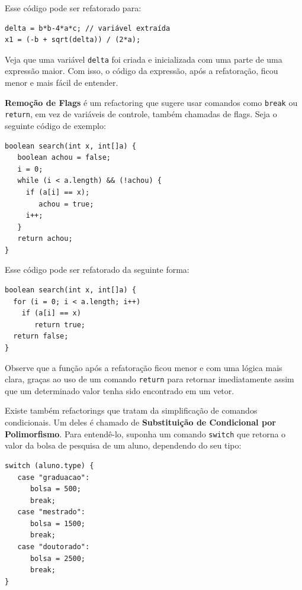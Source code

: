 \documentclass[
  11pt,
  twoside]{book}
\newcommand{\passthrough}[1]{#1}
\begin{document}
Esse código pode ser refatorado para:

\begin{lstlisting}
delta = b*b-4*a*c; // variável extraída
x1 = (-b + sqrt(delta)) / (2*a);
\end{lstlisting}

Veja que uma variável \passthrough{\lstinline!delta!} foi criada e
inicializada com uma parte de uma expressão maior. Com isso, o código da
expressão, após a refatoração, ficou menor e mais fácil de entender.

 \textbf{Remoção de Flags} é um
refactoring que sugere usar comandos como
\passthrough{\lstinline!break!} ou \passthrough{\lstinline!return!}, em
vez de variáveis de controle, também chamadas de flags. Seja o seguinte
código de exemplo:

\begin{lstlisting}
boolean search(int x, int[]a) {
   boolean achou = false;
   i = 0;
   while (i < a.length) && (!achou) {
     if (a[i] == x);
        achou = true;
     i++;
   }
   return achou;
}
\end{lstlisting}

Esse código pode ser refatorado da seguinte forma:

\begin{lstlisting}
boolean search(int x, int[]a) {
  for (i = 0; i < a.length; i++)
    if (a[i] == x)
       return true;
  return false;
}
\end{lstlisting}

Observe que a função após a refatoração ficou menor e com uma lógica
mais clara, graças ao uso de um comando \passthrough{\lstinline!return!}
para retornar imediatamente assim que um determinado valor tenha sido
encontrado em um vetor.

 Existe
também refactorings que tratam da simplificação de comandos
condicionais. Um deles é chamado de \textbf{Substituição de Condicional
por Polimorfismo}. Para entendê-lo, suponha um comando
\passthrough{\lstinline!switch!} que retorna o valor da bolsa de
pesquisa de um aluno, dependendo do seu tipo:

\begin{lstlisting}
switch (aluno.type) {
   case "graduacao": 
      bolsa = 500;
      break;
   case "mestrado": 
      bolsa = 1500;
      break;
   case "doutorado": 
      bolsa = 2500;
      break;
}
\end{lstlisting}
\end{document}

